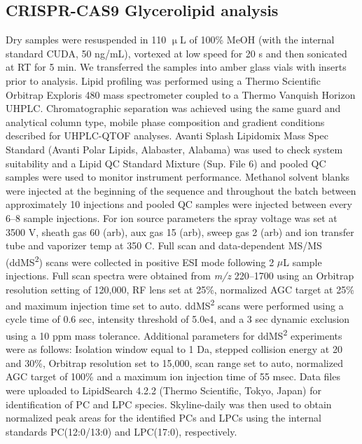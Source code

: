 \documentclass[9pt,twocolumn,twoside,lineno]{biorxiv}
\begin{document}
\subsection{CRISPR-CAS9 Glycerolipid analysis}
Dry samples were resuspended in 110 $\upmu$L of 100\% MeOH (with the internal standard CUDA, 50 ng/mL), vortexed at low speed for 20 s and then sonicated at RT for 5 min. 
We transferred the samples into amber glass vials with inserts prior to analysis. 
Lipid profiling was performed using a Thermo Scientific Orbitrap Exploris 480 mass spectrometer coupled to a Thermo Vanquish Horizon UHPLC. 
Chromatographic separation was achieved using the same guard and analytical column type, mobile phase composition and gradient conditions described for UHPLC-QTOF analyses. 
Avanti Splash Lipidomix Mass Spec Standard (Avanti Polar Lipids, Alabaster, Alabama) was used to check system suitability and a Lipid QC Standard Mixture (Sup. File 6) and pooled QC samples were used to monitor instrument performance. 
Methanol solvent blanks were injected at the beginning of the sequence and throughout the batch between approximately 10 injections and pooled QC samples were injected between every 6–8 sample injections. 
For ion source parameters the spray voltage was set at 3500 V, sheath gas 60 (arb), aux gas 15 (arb), sweep gas 2 (arb) and ion transfer tube and vaporizer temp at 350 \degree C. 
Full scan and data-dependent MS/MS (ddMS\textsuperscript{2}) scans were collected in positive ESI mode following 2 $\mu$L sample injections. 
Full scan spectra were obtained from \textit{m/z} 220--1700 using an Orbitrap resolution setting of 120,000, RF lens set at 25\%, normalized AGC target at 25\% and maximum injection time set to auto. 
ddMS\textsuperscript{2} scans were performed using a cycle time of 0.6 sec, intensity threshold of 5.0e4, and a 3 sec dynamic exclusion using a 10 ppm mass tolerance. 
Additional parameters for ddMS\textsuperscript{2} experiments were as follows: Isolation window equal to 1 Da, stepped collision energy at 20 and 30\%, Orbitrap resolution set to 15,000, scan range set to auto, normalized AGC target of 100\% and a maximum ion injection time of 55 msec. 
Data files were uploaded to LipidSearch 4.2.2 (Thermo Scientific, Tokyo, Japan) for identification of PC and LPC species. 
Skyline-daily \cite{Adams2020-em} was then used to obtain normalized peak areas for the identified PCs and LPCs using the internal standards PC(12:0/13:0) and LPC(17:0), respectively.
\end{document}
